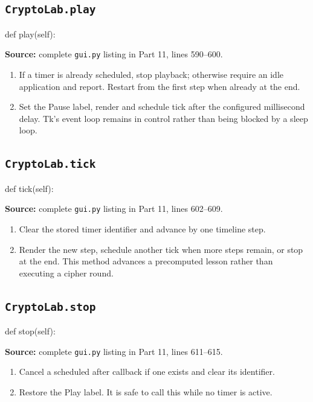 \subsection{\texttt{CryptoLab.play}}
\begin{lightcode}
def play(self):
\end{lightcode}
\noindent\textbf{Source:} complete \texttt{gui.py} listing in Part 11, lines 590--600.
\begin{enumerate}
\item If a timer is already scheduled, stop playback; otherwise require an idle application and report. Restart from the first step when already at the end.
\item Set the Pause label, render and schedule tick after the configured millisecond delay. Tk's event loop remains in control rather than being blocked by a sleep loop.
\end{enumerate}
\subsection{\texttt{CryptoLab.tick}}
\begin{lightcode}
def tick(self):
\end{lightcode}
\noindent\textbf{Source:} complete \texttt{gui.py} listing in Part 11, lines 602--609.
\begin{enumerate}
\item Clear the stored timer identifier and advance by one timeline step.
\item Render the new step, schedule another tick when more steps remain, or stop at the end. This method advances a precomputed lesson rather than executing a cipher round.
\end{enumerate}
\subsection{\texttt{CryptoLab.stop}}
\begin{lightcode}
def stop(self):
\end{lightcode}
\noindent\textbf{Source:} complete \texttt{gui.py} listing in Part 11, lines 611--615.
\begin{enumerate}
\item Cancel a scheduled after callback if one exists and clear its identifier.
\item Restore the Play label. It is safe to call this while no timer is active.
\end{enumerate}
